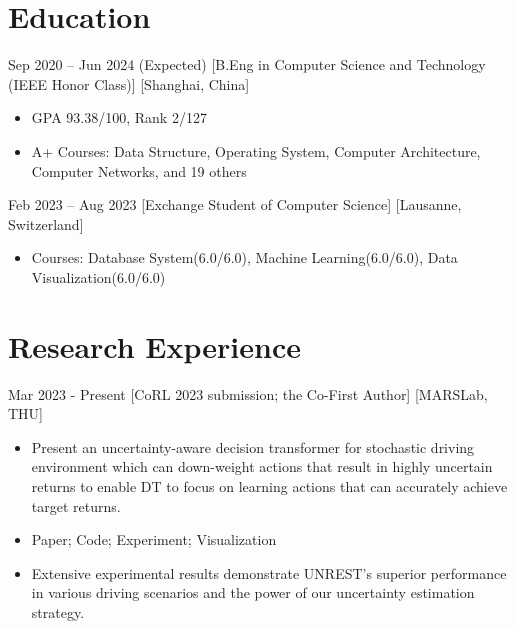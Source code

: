 \documentclass{chicv}
\begin{document}
\begin{basicinfo}
\end{basicinfo}

\section{Education}
{Sep 2020 -- Jun 2024 (Expected)}
[B.Eng in Computer Science and Technology (IEEE Honor Class)]
[Shanghai, China]
\begin{itemize}
	\item GPA 93.38/100, Rank 2/127
	\item A+ Courses: Data Structure, Operating System, Computer Architecture, Computer Networks, and 19 others
\end{itemize}

  {Feb 2023 -- Aug 2023}
  [Exchange Student of Computer Science]
  [Lausanne, Switzerland]
  \begin{itemize}
  	\item Courses: Database System(6.0/6.0), Machine Learning(6.0/6.0), Data Visualization(6.0/6.0)
  \end{itemize}

\section{Research Experience}

{Mar 2023 - Present}
[CoRL 2023 submission; the Co-First Author]
[MARSLab, THU]

\begin{itemize}
	\item Present an uncertainty-aware decision transformer for stochastic driving environment which can down-weight actions that result in highly uncertain returns to enable DT to focus on learning actions that can accurately achieve target returns.
	\item Paper; Code; Experiment; Visualization
	\item Extensive experimental results demonstrate UNREST's superior performance in various driving scenarios and the power of our uncertainty estimation strategy.
\end{itemize}
\end{document}
